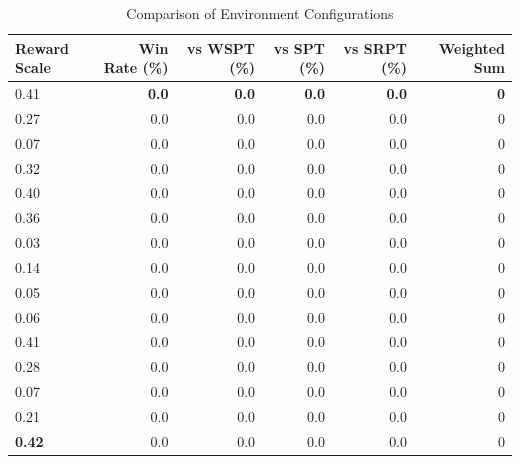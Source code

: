 \begin{table}[htbp]%
\centering%
\begin{tabular}{lrrrrr}%
\toprule%
\textbf{Reward Scale}&\textbf{Win Rate (\%)}&\textbf{vs WSPT (\%)}&\textbf{vs SPT (\%)}&\textbf{vs SRPT (\%)}&\textbf{Weighted Sum}\\%
\midrule%
0.41&\textbf{0.0}&\textbf{0.0}&\textbf{0.0}&\textbf{0.0}&\textbf{0}\\%
0.27&0.0&0.0&0.0&0.0&0\\%
0.07&0.0&0.0&0.0&0.0&0\\%
0.32&0.0&0.0&0.0&0.0&0\\%
0.40&0.0&0.0&0.0&0.0&0\\%
0.36&0.0&0.0&0.0&0.0&0\\%
0.03&0.0&0.0&0.0&0.0&0\\%
0.14&0.0&0.0&0.0&0.0&0\\%
0.05&0.0&0.0&0.0&0.0&0\\%
0.06&0.0&0.0&0.0&0.0&0\\%
0.41&0.0&0.0&0.0&0.0&0\\%
0.28&0.0&0.0&0.0&0.0&0\\%
0.07&0.0&0.0&0.0&0.0&0\\%
0.21&0.0&0.0&0.0&0.0&0\\%
\textbf{0.42}&0.0&0.0&0.0&0.0&0\\%
\bottomrule%
\end{tabular}%
\caption{Comparison of Environment Configurations}%
\label{tab:environment}%
\end{table}
